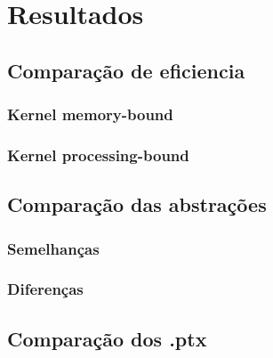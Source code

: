 \section{Resultados}
\subsection{Comparação de eficiencia}
\subsubsection{Kernel memory-bound}
\subsubsection{Kernel processing-bound}
\subsection{Comparação das abstrações}
\subsubsection{Semelhanças}
\subsubsection{Diferenças}
\subsection{Comparação dos .ptx}
